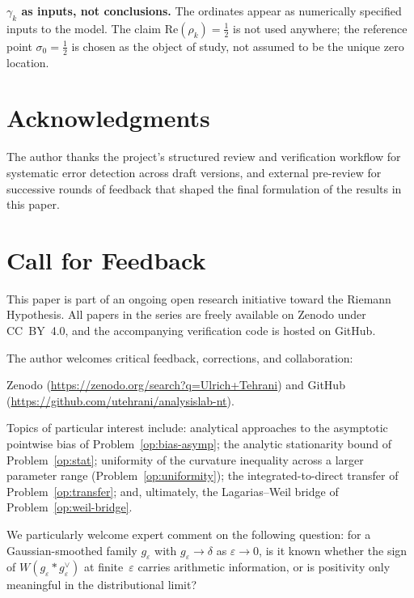 \documentclass[11pt]{article}
\begin{document}
\textbf{$\gamma_k$ as inputs, not conclusions.}
The ordinates appear as numerically specified inputs to the model.
The claim $\mathrm{Re}(\rho_k)=\tfrac12$ is not used anywhere; the
reference point $\sigma_0=\tfrac12$ is chosen as the object of study,
not assumed to be the unique zero location.

\section*{Acknowledgments}

The author thanks the project's structured review and verification
workflow for systematic error detection across draft versions, and
external pre-review for successive rounds of feedback that shaped the
final formulation of the results in this paper.

\section*{Call for Feedback}

This paper is part of an ongoing open research initiative toward the
Riemann Hypothesis.
All papers in the series are freely available on Zenodo under CC~BY~4.0,
and the accompanying verification code is hosted on GitHub.

The author welcomes critical feedback, corrections, and collaboration:
{\sloppy
Zenodo (\url{https://zenodo.org/search?q=Ulrich+Tehrani}) and GitHub
(\url{https://github.com/utehrani/analysislab-nt}).
\par}

Topics of particular interest include: analytical approaches to the
asymptotic pointwise bias of Problem~\ref{op:bias-asymp}; the analytic
stationarity bound of Problem~\ref{op:stat}; uniformity of the
curvature inequality across a larger parameter range
(Problem~\ref{op:uniformity}); the integrated-to-direct transfer of
Problem~\ref{op:transfer}; and, ultimately, the Lagarias--Weil bridge
of Problem~\ref{op:weil-bridge}.

We particularly welcome expert comment on the following question:
for a Gaussian-smoothed family $g_\varepsilon$ with
$g_\varepsilon\to\delta$ as $\varepsilon\to 0$, is it known whether
the sign of $W(g_\varepsilon * g_\varepsilon^\vee)$ at
finite~$\varepsilon$ carries arithmetic information, or is positivity
only meaningful in the distributional limit?
\end{document}
